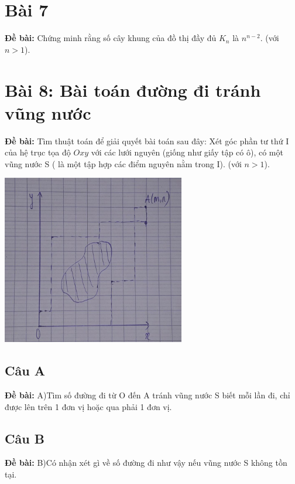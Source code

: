 \documentclass[12pt]{article}
\begin{document}
\begin{sloppypar}
\section{Bài 7}
\begin{tcolorbox}
    \textbf{Đề bài:} Chứng minh rằng số cây khung của đồ thị đầy đủ \(K_{n}\) là \(n^{n-2}\).
    (với \(n > 1\)).
\end{tcolorbox}

\section{Bài 8: Bài toán đường đi tránh vũng nước}
\begin{tcolorbox}
    \textbf{Đề bài:} Tìm thuật toán để giải quyết bài toán sau đây: Xét góc phần tư thứ I của hệ trục tọa độ \(Oxy\) với các lưới nguyên (giống như giấy tập có ô), có một vũng nước S ( là một tập hợp các điểm nguyên nằm trong I).
    (với \(n > 1\)).
\end{tcolorbox}

\begin{center}
    {\includegraphics[width=8cm]{7.png}}
\end{center}

\subsection{Câu A}
\begin{tcolorbox}
    \textbf{Đề bài:} A)Tìm số đường đi từ O đến A tránh vũng nước S biết mỗi lần đi, chỉ được lên trên 1 đơn vị hoặc qua phải 1 đơn vị.
\end{tcolorbox}
\subsection{Câu B}
\begin{tcolorbox}
    \textbf{Đề bài:} B)Có nhận xét gì về số đường đi như vậy nếu vũng nước S không tồn tại.
\end{tcolorbox}


\end{sloppypar}
\end{document}
